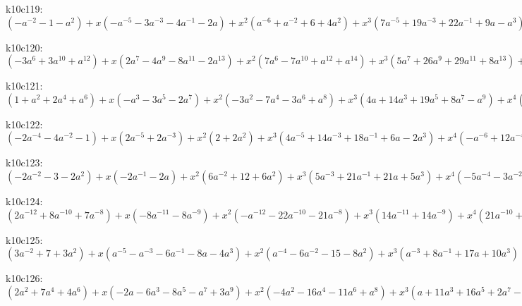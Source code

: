 k10c119: $ (-a^{-2}-1-a^{2}) +x(-a^{-5}-3a^{-3}-4a^{-1}-2a) +x^{2}(a^{-6}+a^{-2}+6+4a^{2}) +x^{3}(7a^{-5}+19a^{-3}+22a^{-1}+9a-a^{3}) +x^{4}(-2a^{-6}+8a^{-4}+13a^{-2}-7-9a^{2}+a^{4}) +x^{5}(-10a^{-5}-26a^{-3}-37a^{-1}-17a+4a^{3}) +x^{6}(a^{-6}-14a^{-4}-31a^{-2}-7+9a^{2}) +x^{7}(4a^{-5}+5a^{-3}+13a^{-1}+12a) +x^{8}(6a^{-4}+15a^{-2}+9) +x^{9}(3a^{-3}+3a^{-1}) $

k10c120: $ (-3a^{6}+3a^{10}+a^{12}) +x(2a^{7}-4a^{9}-8a^{11}-2a^{13}) +x^{2}(7a^{6}-7a^{10}+a^{12}+a^{14}) +x^{3}(5a^{7}+26a^{9}+29a^{11}+8a^{13}) +x^{4}(a^{4}-11a^{6}-3a^{8}+17a^{10}+6a^{12}-2a^{14}) +x^{5}(4a^{5}-17a^{7}-44a^{9}-33a^{11}-10a^{13}) +x^{6}(10a^{6}-9a^{8}-33a^{10}-13a^{12}+a^{14}) +x^{7}(13a^{7}+16a^{9}+7a^{11}+4a^{13}) +x^{8}(10a^{8}+16a^{10}+6a^{12}) +x^{9}(3a^{9}+3a^{11}) $

k10c121: $ (1+a^{2}+2a^{4}+a^{6}) +x(-a^{3}-3a^{5}-2a^{7}) +x^{2}(-3a^{2}-7a^{4}-3a^{6}+a^{8}) +x^{3}(4a+14a^{3}+19a^{5}+8a^{7}-a^{9}) +x^{4}(-5+3a^{2}+22a^{4}+9a^{6}-5a^{8}) +x^{5}(a^{-1}-15a-30a^{3}-28a^{5}-13a^{7}+a^{9}) +x^{6}(5-13a^{2}-36a^{4}-14a^{6}+4a^{8}) +x^{7}(10a+11a^{3}+9a^{5}+8a^{7}) +x^{8}(10a^{2}+19a^{4}+9a^{6}) +x^{9}(4a^{3}+4a^{5}) $

k10c122: $ (-2a^{-4}-4a^{-2}-1) +x(2a^{-5}+2a^{-3}) +x^{2}(2+2a^{2}) +x^{3}(4a^{-5}+14a^{-3}+18a^{-1}+6a-2a^{3}) +x^{4}(-a^{-6}+12a^{-4}+24a^{-2}+3-7a^{2}+a^{4}) +x^{5}(-11a^{-5}-25a^{-3}-32a^{-1}-14a+4a^{3}) +x^{6}(a^{-6}-20a^{-4}-42a^{-2}-13+8a^{2}) +x^{7}(5a^{-5}+3a^{-3}+9a^{-1}+11a) +x^{8}(8a^{-4}+18a^{-2}+10) +x^{9}(4a^{-3}+4a^{-1}) $

k10c123: $ (-2a^{-2}-3-2a^{2}) +x(-2a^{-1}-2a) +x^{2}(6a^{-2}+12+6a^{2}) +x^{3}(5a^{-3}+21a^{-1}+21a+5a^{3}) +x^{4}(-5a^{-4}-3a^{-2}+4-3a^{2}-5a^{4}) +x^{5}(a^{-5}-15a^{-3}-38a^{-1}-38a-15a^{3}+a^{5}) +x^{6}(5a^{-4}-11a^{-2}-32-11a^{2}+5a^{4}) +x^{7}(10a^{-3}+14a^{-1}+14a+10a^{3}) +x^{8}(10a^{-2}+20+10a^{2}) +x^{9}(4a^{-1}+4a) $

k10c124: $ (2a^{-12}+8a^{-10}+7a^{-8}) +x(-8a^{-11}-8a^{-9}) +x^{2}(-a^{-12}-22a^{-10}-21a^{-8}) +x^{3}(14a^{-11}+14a^{-9}) +x^{4}(21a^{-10}+21a^{-8}) +x^{5}(-7a^{-11}-7a^{-9}) +x^{6}(-8a^{-10}-8a^{-8}) +x^{7}(a^{-11}+a^{-9}) +x^{8}(a^{-10}+a^{-8}) $

k10c125: $ (3a^{-2}+7+3a^{2}) +x(a^{-5}-a^{-3}-6a^{-1}-8a-4a^{3}) +x^{2}(a^{-4}-6a^{-2}-15-8a^{2}) +x^{3}(a^{-3}+8a^{-1}+17a+10a^{3}) +x^{4}(2a^{-2}+13+11a^{2}) +x^{5}(-5a^{-1}-11a-6a^{3}) +x^{6}(-6-6a^{2}) +x^{7}(a^{-1}+2a+a^{3}) +x^{8}(1+a^{2}) $

k10c126: $ (2a^{2}+7a^{4}+4a^{6}) +x(-2a-6a^{3}-8a^{5}-a^{7}+3a^{9}) +x^{2}(-4a^{2}-16a^{4}-11a^{6}+a^{8}) +x^{3}(a+11a^{3}+16a^{5}+2a^{7}-4a^{9}) +x^{4}(2a^{2}+16a^{4}+11a^{6}-3a^{8}) +x^{5}(-5a^{3}-9a^{5}-3a^{7}+a^{9}) +x^{6}(-6a^{4}-5a^{6}+a^{8}) +x^{7}(a^{3}+2a^{5}+a^{7}) +x^{8}(a^{4}+a^{6}) $

